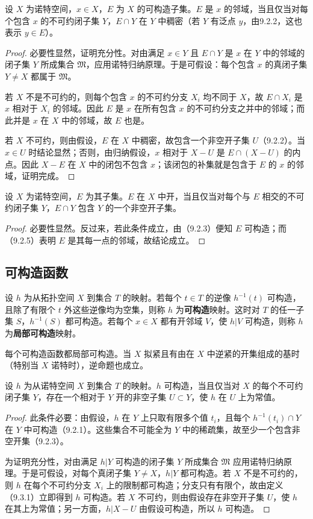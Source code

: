 设 $X$ 为诺特空间，$x\in X$，$E$ 为 $X$ 的可构造子集。$E$ 是 $x$ 的邻域，当且仅当对每个包含 $x$ 的不可约闭子集 $Y$，$E\cap Y$ 在 $Y$ 中稠密（若 $Y$ 有泛点 $y$，由9.2.2，这也表示 $y\in E$）。
\begin{proof}
必要性显然，证明充分性。对由满足 $x\in Y$ 且 $E\cap Y$ 是 $x$ 在 $Y$ 中的邻域的闭子集 $Y$ 所成集合 $\mathfrak M$，应用诺特归纳原理。于是可假设：每个包含 $x$ 的真闭子集 $Y\ne X$ 都属于 $\mathfrak M$。

若 $X$ 不是不可约的，则每个包含 $x$ 的不可约分支 $X_i$ 均不同于 $X$，故 $E\cap X_i$ 是 $x$ 相对于 $X_i$ 的邻域。因此 $E$ 是 $x$ 在所有包含 $x$ 的不可约分支之并中的邻域；而此并是 $x$ 在 $X$ 中的邻域，故 $E$ 也是。

若 $X$ 不可约，则由假设，$E$ 在 $X$ 中稠密，故包含一个非空开子集 $U$（9.2.2）。当 $x\in U$ 时结论显然；否则，由归纳假设，$x$ 相对于 $X-U$ 是 $E\cap(X-U)$ 的内点。因此 $X-E$ 在 $X$ 中的闭包不包含 $x$；该闭包的补集就是包含于 $E$ 的 $x$ 的邻域，证明完成。
\end{proof}

设 $X$ 为诺特空间，$E$ 为其子集。$E$ 在 $X$ 中开，当且仅当对每个与 $E$ 相交的不可约闭子集 $Y$，$E\cap Y$ 包含 $Y$ 的一个非空开子集。
\begin{proof}
必要性显然。反过来，若此条件成立，由（9.2.3）便知 $E$ 可构造；而（9.2.5）表明 $E$ 是其每一点的邻域，故结论成立。
\end{proof}

\subsection{可构造函数}
设 $h$ 为从拓扑空间 $X$ 到集合 $T$ 的映射。若每个 $t\in T$ 的逆像 $h^{-1}(t)$ 可构造，且除了有限个 $t$ 外这些逆像均为空集，则称 $h$ 为\textbf{可构造}映射。这时对 $T$ 的任一子集 $S$，$h^{-1}(S)$ 都可构造。若每个 $x\in X$ 都有开邻域 $V$，使 $h|V$ 可构造，则称 $h$ 为\textbf{局部可构造}映射。

每个可构造函数都局部可构造。当 $X$ 拟紧且有由在 $X$ 中逆紧的开集组成的基时（特别当 $X$ 诺特时），逆命题也成立。

设 $h$ 为从诺特空间 $X$ 到集合 $T$ 的映射。$h$ 可构造，当且仅当对 $X$ 的每个不可约闭子集 $Y$，存在一个相对于 $Y$ 开的非空子集 $U\subset Y$，使 $h$ 在 $U$ 上为常值。
\begin{proof}
此条件必要：由假设，$h$ 在 $Y$ 上只取有限多个值 $t_i$，且每个 $h^{-1}(t_i)\cap Y$ 在 $Y$ 中可构造（9.2.1）。这些集合不可能全为 $Y$ 中的稀疏集，故至少一个包含非空开集（9.2.3）。

为证明充分性，对由满足 $h|Y$ 可构造的闭子集 $Y$ 所成集合 $\mathfrak M$ 应用诺特归纳原理。于是可假设，对每个真闭子集 $Y\ne X$，$h|Y$ 都可构造。若 $X$ 不是不可约的，则 $h$ 在每个不可约分支 $X_i$ 上的限制都可构造；分支只有有限个，故由定义（9.3.1）立即得到 $h$ 可构造。若 $X$ 不可约，则由假设存在非空开子集 $U$，使 $h$ 在其上为常值；另一方面，$h|X-U$ 由假设可构造，所以 $h$ 可构造。
\end{proof}

